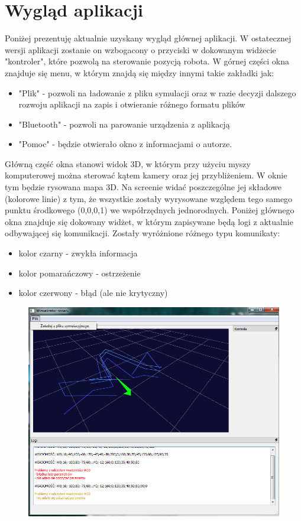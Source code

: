 \documentclass[a4paper,12pt]{article}
\begin{document}
\section{Wygląd aplikacji}
Poniżej prezentuję aktualnie uzyskany wygląd głównej aplikacji. W ostatecznej wersji aplikacji zostanie on wzbogacony o przyciski w dokowanym widżecie "kontroler",
które pozwolą na sterowanie pozycją robota. W górnej części okna znajduje się menu, w którym znajdą się między innymi takie zakładki jak:
\begin{itemize}
\item "Plik" - pozwoli na ładowanie z pliku symulacji oraz w razie decyzji dalszego rozwoju aplikacji na zapis i otwieranie różnego formatu plików
\item "Bluetooth" - pozwoli na parowanie urządzenia z aplikacją
\item "Pomoc" - będzie otwierało okno z informacjami o autorze.
\end{itemize}
Główną część okna stanowi widok 3D, w którym przy użyciu myszy komputerowej można sterować kątem kamery oraz jej przybliżeniem. W oknie tym będzie rysowana mapa 3D.
Na screenie widać poszczególne jej składowe (kolorowe linie) z tym, że wszystkie zostały wyrysowane względem tego samego punktu środkowego (0,0,0,1) we współrzędnych
jednorodnych. 
Poniżej głównego okna znajduje się dokowany widżet, w którym zapisywane będą logi z aktualnie odbywającej się komunikacji. Zostały wyróżnione różnego typu komunikaty:
\begin{itemize}
\item kolor czarny - zwykła informacja
\item kolor pomarańczowy - ostrzeżenie
\item kolor czerwony - błąd (ale nie krytyczny)
\end{itemize}

\begin{figure} [H]
\centering
\includegraphics[width=\textwidth]{screen.png}
\end{figure}
\end{document}

